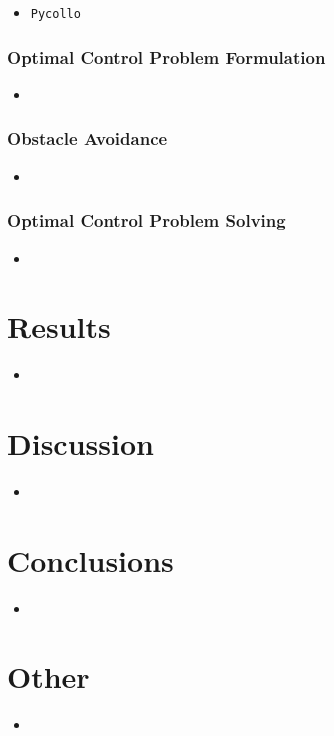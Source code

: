 \documentclass{article}
\newcommand{\softwarepackage}[1]{\texttt{#1}}
\newcommand{\pycollo}{\softwarepackage{Pycollo}}
\begin{document}
\begin{itemize}
    \item \pycollo{}~\cite{brockie_2021_predictive}
\end{itemize}

\subsubsection{Optimal Control Problem Formulation}

\begin{itemize}
    \item 
\end{itemize}

\subsubsection{Obstacle Avoidance}

\begin{itemize}
    \item 
\end{itemize}

\subsubsection{Optimal Control Problem Solving}

\begin{itemize}
    \item 
\end{itemize}

\section{Results}

\begin{itemize}
    \item 
\end{itemize}

\section{Discussion}

\begin{itemize}
    \item 
\end{itemize}

\section{Conclusions}

\begin{itemize}
    \item 
\end{itemize}

\section{Other}

\begin{itemize}
    \item 
\end{itemize}

\printbibliography
\end{document}
